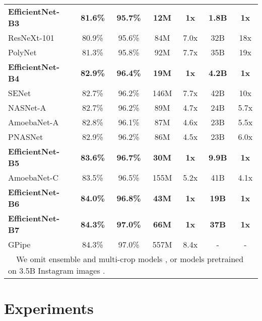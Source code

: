 \documentclass{article}
\begin{document}
\begin{table*}
{\begin{tabular}{l|cc||cc||cc}
         \midrule
		\bf EfficientNet-B3  & \bf 81.6\% & \bf 95.7\% & \bf 12M  & \bf 1x & \bf 1.8B & \bf  1x \\
		ResNeXt-101 \cite{resnext17} & 80.9\% & 95.6\% & 84M & 7.0x & 32B & 18x \\
		PolyNet \cite{polynet17} & 81.3\%  & 95.8\% & 92M & 7.7x & 35B & 19x \\

		\midrule
		\bf EfficientNet-B4  & \bf 82.9\% & \bf 96.4\% & \bf 19M  & \bf 1x & \bf 4.2B & \bf  1x \\
		SENet \cite{senet18} & 82.7\% & 96.2\% & 146M & 7.7x & 42B & 10x \\
		 NASNet-A \cite{nas_imagenet18} & 82.7\% & 96.2\% & 89M & 4.7x & 24B & 5.7x \\
		 AmoebaNet-A \cite{amoebanets18} & 82.8\% & 96.1\% & 87M & 4.6x & 23B & 5.5x \\
		 PNASNet \cite{pnas18} & 82.9\% & 96.2\% & 86M & 4.5x & 23B & 6.0x \\

		\midrule
		\bf EfficientNet-B5  & \bf 83.6\% & \bf 96.7\% & \bf 30M  & \bf 1x & \bf 9.9B & \bf  1x \\
		 AmoebaNet-C  \cite{autoaugment18} &  83.5\%  & 96.5\% & 155M & 5.2x & 41B & 4.1x \\

		\midrule
		 \bf EfficientNet-B6  & \bf 84.0\% & \bf 96.8\% & \bf 43M  & \bf 1x & \bf 19B & \bf  1x \\
		\midrule
		\bf EfficientNet-B7  & \bf 84.3\% & \bf 97.0\% & \bf 66M  & \bf 1x & \bf 37B & \bf  1x \\
		GPipe \cite{gpipe18}  & 84.3\% & 97.0\% & 557M & 8.4x & - & - \\
        \bottomrule[0.15em]
        \multicolumn{7}{l}{~~We omit ensemble and multi-crop models \cite{senet18}, or models pretrained on 3.5B Instagram images \cite{imagenetinstagram18}.~~}
        \end{tabular}
    }
    \label{tab:imagenet}
\end{table*}
 
\section{Experiments}
\label{sec:results}
\end{document}
